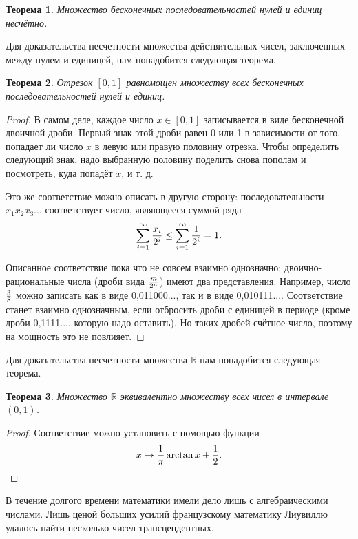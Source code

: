 \documentclass{article}
\newtheorem{theorem}{Теорема}[section]
\begin{document}
\begin{theorem}
Множество бесконечных последовательностей нулей и единиц несчётно.
\end{theorem}

Для доказательства несчетности множества действительных чисел, заключенных между нулем и единицей, нам понадобится следующая теорема.

\begin{theorem}
Отрезок \([0, 1]\) равномощен множеству всех бесконечных последовательностей нулей и единиц.
\end{theorem}

\begin{proof}
В самом деле, каждое число \(x \in [0, 1]\) записывается в виде бесконечной двоичной дроби. Первый знак этой дроби равен 0 или 1 в зависимости от того, попадает ли число \(x\) в левую или правую половину отрезка. Чтобы определить следующий знак, надо выбранную половину поделить снова пополам и посмотреть, куда попадёт \(x\), и т. д.

Это же соответствие можно описать в другую сторону: последовательности \(x_1x_2x_3...\) соответствует число, являющееся суммой ряда
\[
\sum_{i=1}^{\infty} {x_i \over 2^i} \leq \sum_{i=1}^{\infty} {1 \over 2^i} = 1.
\]

Описанное соответствие пока что не совсем взаимно однозначно: двоично-рациональные числа (дроби вида \(m \over 2^n\)) имеют два представления. Например, число \(3 \over 8\) можно записать как в виде 0,011000..., так и в виде 0,010111.... Соответствие станет взаимно однозначным, если отбросить дроби с единицей в периоде (кроме дроби 0,1111..., которую надо оставить). Но таких дробей счётное число, поэтому на мощность это не повлияет.
\end{proof}

Для доказательства несчетности множества \(\mathbb{R}\) нам понадобится следующая теорема.

\begin{theorem}
Множество \(\mathbb{R}\) эквивалентно множеству всех чисел в интервале \((0, 1)\).
\end{theorem}

\begin{proof}
Соответствие можно установить с помощью функции
\[
x \to {1 \over \pi}\arctan{x} + {1 \over 2}.
\]
\end{proof}

В течение долгого времени математики имели дело лишь с алгебраическими числами. Лишь ценой больших усилий французскому математику Лиувиллю удалось найти несколько чисел трансцендентных.
\end{document}
